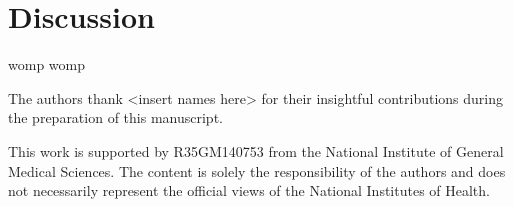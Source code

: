 \documentclass[journal=jmcmar,manuscript=article]{achemso}
\begin{document}
\section{Discussion}

womp womp

\begin{acknowledgement}


The authors thank <insert names here> for their insightful contributions during the preparation of this manuscript.

This work is supported by R35GM140753 from the National Institute of General Medical Sciences. The content is solely the responsibility of the authors and does not necessarily represent the official views of the National Institutes of Health.

\end{acknowledgement}




\end{document}
